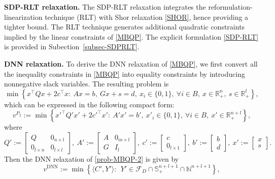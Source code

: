 \documentclass[11pt]{article}
\theoremstyle{plain}
\def\<{\big\langle}
\def\>{\big\rangle}
\def\F{\mathcal{F}}
\def\R{\mathbb{R}}
\def\tb#1{\textbf{#1}}
\begin{document}
\bigskip


\noindent\tb{SDP-RLT relaxation.}
The SDP-RLT relaxation integrates the reformulation-linearization technique  (RLT) \cite{sherali2007rlt} with Shor relaxation \eqref{SHOR}, hence providing a tighter bound. The RLT technique generates additional quadratic constraints implied by the linear constraints of \eqref{MBQP}. The explicit formulation \eqref{SDP-RLT} is provided in Subection~\ref{subsec-SDPRLT}.

\bigskip


\noindent\tb{DNN relaxation.}
To derive the DNN relaxation of \eqref{MBQP}, we first convert all the inequality constraints in \eqref{MBQP} into equality constraints by introducing nonnegative slack variables. The resulting problem is
%
\begin{equation*}
\min\left\{x^{\top} Q x+2 c^{\top}x : \ Ax=b,\ Gx+s= d,\ x_i \in\{0,1\},\ \forall i \in B,\ x\in \R^{n}_+,\ s\in  \R^{l}_+\right\},
\end{equation*}
%
which can be expressed in the following compact form:
\begin{equation}\label{prob-MBQP-2}
v^{P_2}:=\min\left\{x'^{\top} Q' x'+2 c'^{\top}x' : \ A'x'=b',\ x'_i \in\{0,1\},\ \forall i \in B,\ x'\in \R^{n+l}_+\right\},
\tag{$P_2$}
\end{equation}
where
%
\[
Q':=\begin{bmatrix}
Q & 0_{n\times l}\\ 
0_{l\times n} & 0_{l\times l}
\end{bmatrix},\
A':=\begin{bmatrix}
A&0_{m\times l}\\
 G&I_l
\end{bmatrix},\ 
c':=\begin{bmatrix}
c\\
0_{l\times 1}
\end{bmatrix},\
b':=\begin{bmatrix}
b\\
d
\end{bmatrix},\ 
x':=\begin{bmatrix}
x\\
s
\end{bmatrix}.
\]
%
Then the DNN relaxation of \eqref{prob-MBQP-2} is given by  
\begin{equation}\label{DNN}
v^{\text{DNN}}:=\min\left\{
\<C',Y'\>  :\  \
Y'\in \F_D\cap \mathbb{S}_{+}^{n+l+1} \cap\mathbb{N}^{n+l+1}
\right\},\tag{DNN}
\end{equation}
\end{document}
